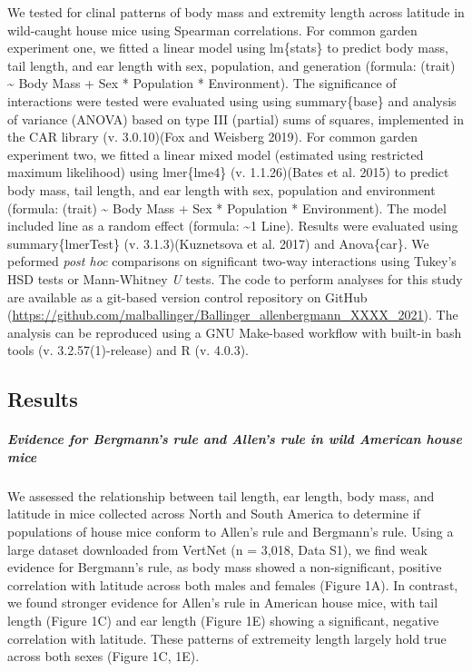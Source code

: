 \documentclass[]{article}
\let\oldsubparagraph\subparagraph
\renewcommand{\subparagraph}[1]{\oldsubparagraph{#1}\mbox{}}
\begin{document}
We tested for clinal patterns of body mass and extremity length across
latitude in wild-caught house mice using Spearman correlations. For
common garden experiment one, we fitted a linear model using lm\{stats\}
to predict body mass, tail length, and ear length with sex, population,
and generation (formula: (trait) \textasciitilde{} Body Mass + Sex *
Population * Environment). The significance of interactions were tested
were evaluated using using summary\{base\} and analysis of variance
(ANOVA) based on type III (partial) sums of squares, implemented in the
CAR library (v. 3.0.10)(Fox and Weisberg 2019). For common garden
experiment two, we fitted a linear mixed model (estimated using
restricted maximum likelihood) using lmer\{lme4\} (v. 1.1.26)(Bates et
al. 2015) to predict body mass, tail length, and ear length with sex,
population and environment (formula: (trait) \textasciitilde{} Body Mass
+ Sex * Population * Environment). The model included line as a random
effect (formula: \textasciitilde{}1 \textbar{} Line). Results were
evaluated using summary\{lmerTest\} (v. 3.1.3)(Kuznetsova et al. 2017)
and Anova\{car\}. We peformed \emph{post hoc} comparisons on significant
two-way interactions using Tukey's HSD tests or Mann-Whitney \emph{U}
tests. The code to perform analyses for this study are available as a
git-based version control repository on GitHub
(\url{https://github.com/malballinger/Ballinger_allenbergmann_XXXX_2021}).
The analysis can be reproduced using a GNU Make-based workflow with
built-in bash tools (v. 3.2.57(1)-release) and R (v. 4.0.3).

\newpage

\hypertarget{results}{%
\subsection{Results}\label{results}}

\hypertarget{evidence-for-bergmanns-rule-and-allens-rule-in-wild-american-house-mice}{%
\subparagraph{\texorpdfstring{\emph{Evidence for Bergmann's rule and
Allen's rule in wild American house
mice}}{Evidence for Bergmann's rule and Allen's rule in wild American house mice}}\label{evidence-for-bergmanns-rule-and-allens-rule-in-wild-american-house-mice}}

We assessed the relationship between tail length, ear length, body mass,
and latitude in mice collected across North and South America to
determine if populations of house mice conform to Allen's rule and
Bergmann's rule. Using a large dataset downloaded from VertNet (n =
3,018, Data S1), we find weak evidence for Bergmann's rule, as body mass
showed a non-significant, positive correlation with latitude across both
males and females (Figure 1A). In contrast, we found stronger evidence
for Allen's rule in American house mice, with tail length (Figure 1C)
and ear length (Figure 1E) showing a significant, negative correlation
with latitude. These patterns of extremeity length largely hold true
across both sexes (Figure 1C, 1E).
\end{document}

